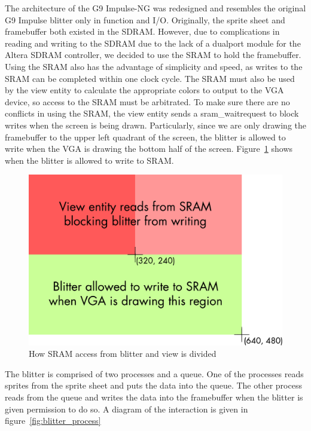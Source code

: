 \documentclass{report}
\begin{document}
The architecture of the G9 Impulse-NG was redesigned and resembles the
original G9 Impulse blitter only in function and I/O. Originally, the
sprite sheet and framebuffer both existed in the SDRAM. However, due to
complications in reading and writing to the SDRAM due to the lack of a
dualport module for the Altera SDRAM controller, we decided to use the
SRAM to hold the framebuffer. Using the SRAM also has the advantage of
simplicity and speed, as writes to the SRAM can be completed within one
clock cycle. The SRAM must also be used by the view entity to calculate
the appropriate colors to output to the VGA device, so access to the
SRAM must be arbitrated. To make sure there are no conflicts in using
the SRAM, the view entity sends a sram\_waitrequest to block writes when
the screen is being drawn. Particularly, since we are only drawing the
framebuffer to the upper left quadrant of the screen, the blitter is
allowed to write when the VGA is drawing the bottom half of the screen.
Figure~\ref{fig:blitter_waitrequest} shows when the blitter is allowed
to write to SRAM.

\begin{figure}[htb!]
    \begin{center}
        \includegraphics[width=4.5in]{blitter_waitrequest}
    \end{center}
    \caption{How SRAM access from blitter and view is divided}
    \label{fig:blitter_waitrequest}
\end{figure}

The blitter is comprised of two processes and a queue. One of the
processes reads sprites from the sprite sheet and puts the data into the
queue. The other process reads from the queue and writes the data into
the framebuffer when the blitter is given permission to do so. A diagram
of the interaction is given in figure~\ref{fig:blitter_process}
\end{document}
